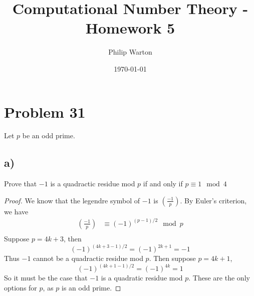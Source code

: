 \documentclass{article}
\theoremstyle{definition}
\begin{document}
\title{Computational Number Theory - Homework 5}
\author{Philip Warton}
\date{\today}
\maketitle
\section*{Problem 31}
Let $p$ be an odd prime.
\subsection*{a)}
\begin{mdframed}
    Prove that $-1$ is a quadractic residue mod $p$ if and only if $p \equiv 1 \mod{4}$
\end{mdframed}
\begin{proof}
    We know that the legendre symbol of $-1$ is $\left(\frac{-1}{p}\right)$. By Euler's criterion, we have
    \begin{align*}
        \left(\frac{-1}{p}\right) & \equiv (-1)^{(p-1)/2} \mod{p} \\
    \end{align*}
    Suppose $p = 4k + 3$, then 
    \[
        (-1)^{(4k + 3 - 1)/2} = (-1)^{2k + 1} = -1
    \]
    Thus $-1$ cannot be a quadractic residue mod $p$. Then suppose $p = 4k + 1$,
    \[ (-1)^{(4k + 1 - 1)/2} = (-1)^{4k} = 1 \]
    So it must be the case that $-1$ is a quadratic residue mod $p$.
    These are the only options for $p$, as $p$ is an odd prime.
\end{proof}
\end{document}
